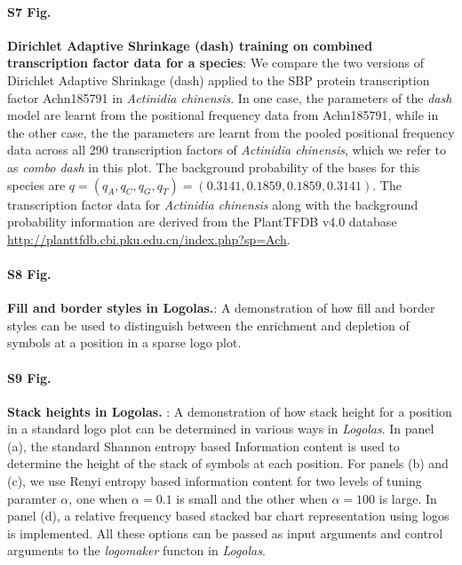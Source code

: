 \documentclass{bmcart}
\begin{document}
\begin{backmatter}
\paragraph*{S7 Fig.}
\label{fig:suppfig7}   
\textbf{Dirichlet Adaptive Shrinkage (dash) training on combined transcription factor data for a species}: 
We compare the two versions of Dirichlet Adaptive Shrinkage (dash) applied to the SBP protein transcription factor Achn185791 in \textit{Actinidia chinensis}. In one case, the parameters of the \textit{dash} model are learnt from the positional frequency data from Achn185791, while in the other case, the the parameters are learnt from the pooled positional frequency data across all 290 transcription factors of \textit{Actinidia chinensis}, which we refer to as \textit{combo dash} in this plot. The background probability of the bases for this species are $ q = \left( q_A, q_C, q_G, q_T \right ) = \left (0.3141, 0.1859, 0.1859, 0.3141 \right ) $. The transcription factor data for 
\textit{Actinidia chinensis} along with the background probability information are derived from the PlantTFDB v4.0 database \url{http://planttfdb.cbi.pku.edu.cn/index.php?sp=Ach}. 


\paragraph*{S8 Fig.}
\label{fig:suppfig8} 
\textbf{Fill and border styles in Logolas.}:
A demonstration of how fill and border styles can be used to distinguish between the enrichment and depletion of symbols at a position in a sparse logo plot.
      
\paragraph*{S9 Fig.}
\label{fig:suppfig9} 
 \textbf{Stack heights in Logolas.} : 
 A demonstration of how stack height for a position in a standard logo plot can be determined in various ways in \textit{Logolas}. In panel (a), the standard Shannon entropy based Information content is used to determine the height of the stack of symbols at each position. For panels (b) and (c), we use Renyi entropy based information content for two levels of tuning paramter $\alpha$, one when $\alpha = 0.1$ is small and the other when $\alpha =100$ is large. In panel (d), a relative frequency based stacked bar chart representation using logos is implemented. All these options can be passed as input arguments and control arguments to the \textit{logomaker} functon in \textit{Logolas}.


\end{backmatter}
\end{document}
